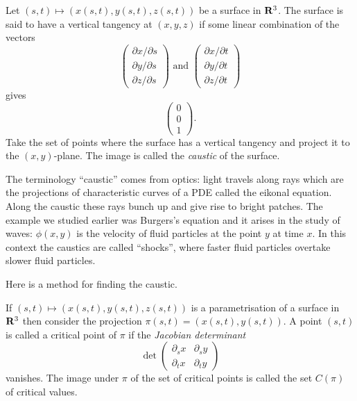 \begin{dfn}
Let $(s,t)\mapsto(x(s,t),y(s,t),z(s,t))$ be a surface in $\mathbf{R}^3$. The surface is said to have a vertical tangency at $(x,y,z)$ if some linear combination of the vectors
\[\left(\begin{array}{c}\partial x/\partial s\\\partial y/\partial s\\ \partial z/\partial s\end{array}\right)\mbox{ and }\left(\begin{array}{c}\partial x/\partial t\\\partial y/\partial t\\ \partial z/\partial t\end{array}\right)\]
gives
\[\left(\begin{array}{c}0\\0\\ 1\end{array}\right).\]
Take the set of points where the surface has a vertical tangency and project it to the $(x,y)$-plane. The image is called the {\em caustic} of the surface.
\end{dfn}

\begin{rmk}
The terminology ``caustic'' comes from optics: light travels along rays which are the projections of characteristic curves of a PDE called the eikonal equation. Along the caustic these rays bunch up and give rise to bright patches. The example we studied earlier was Burgers's equation and it arises in the study of waves: $\phi(x,y)$ is the velocity of fluid particles at the point $y$ at time $x$. In this context the caustics are called ``shocks'', where faster fluid particles overtake slower fluid particles.
\end{rmk}

Here is a method for finding the caustic.

\begin{dfn}
If $(s,t)\mapsto (x(s,t),y(s,t),z(s,t))$ is a parametrisation of a surface in $\mathbf{R}^3$ then consider the projection $\pi(s,t)=(x(s,t),y(s,t))$. A point $(s,t)$ is called a critical point of $\pi$ if the {\em Jacobian determinant}
\[\det\left(\begin{array}{cc}\partial_sx & \partial_sy\\ \partial_tx & \partial_ty\end{array}\right)\]
vanishes. The image under $\pi$ of the set of critical points is called the set $C(\pi)$ of critical values.
\end{dfn}

